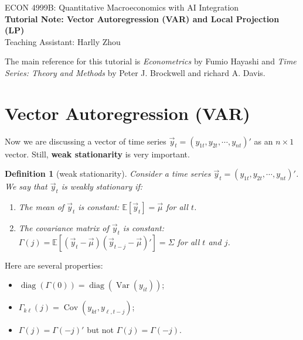 \documentclass[12pt]{article}
\newtheorem{definition}{Definition}
\begin{document}
\begin{center}
    ECON 4999B: Quantitative Macroeconomics with AI Integration\\
    {\large \textbf{Tutorial Note: Vector Autoregression (VAR) and Local Projection (LP)}}\\
    Teaching Assistant: Harlly Zhou
\end{center}

The main reference for this tutorial is \textit{Econometrics} by Fumio Hayashi and \textit{Time Series: Theory and Methods} by Peter J. Brockwell and richard A. Davis.

\section{Vector Autoregression (VAR)}
Now we are discussing a vector of time series $\vec{y}_t = (y_{1t}, y_{2t}, \cdots, y_{nt})'$ as an $n \times 1$ vector. Still, \textbf{weak stationarity} is very important. 
\begin{definition}[weak stationarity]
    Consider a time series $\vec{y}_t = (y_{1t}, y_{2t}, \cdots, y_{nt})'$. We say that $\vec{y}_t$ is weakly stationary if:
    \begin{enumerate}
        \item The mean of $\vec{y}_t$ is constant: $\mathbb{E}[\vec{y}_t] = \vec{\mu}$ for all $t$.
        \item The covariance matrix of $\vec{y}_t$ is constant: $\Gamma(j) = \mathbb{E}[(\vec{y}_t - \vec{\mu})(\vec{y}_{t-j} - \vec{\mu})'] = \Sigma$ for all $t$ and $j$.
    \end{enumerate}
\end{definition}
Here are several properties:
\begin{itemize}
    \item $\operatorname{diag}(\Gamma(0)) = \operatorname{diag}(\operatorname{Var}(y_{it}))$;
    \item $\Gamma_{k \ell}(j) = \operatorname{Cov}(y_{kt}, y_{\ell, t-j})$;
    \item $\Gamma(j) = \Gamma(-j)'$ but not $\Gamma(j) = \Gamma(-j)$.
\end{itemize}
\end{document}
